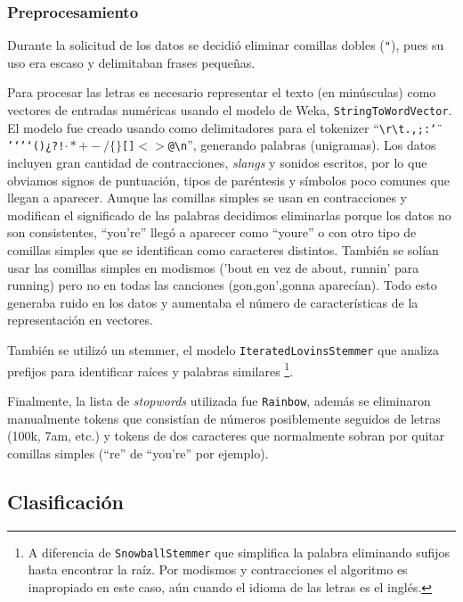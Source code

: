 \documentclass[spanish,11pt,letterpaper]{article}
\begin{document}
\subsubsection{Preprocesamiento}

Durante la solicitud de los datos se decidió eliminar comillas dobles (\texttt{"}),
pues su uso era escaso y delimitaban frases pequeñas.

Para procesar las letras
es necesario representar el texto (en minúsculas) como vectores de entradas numéricas usando
el modelo de Weka, \texttt{StringToWordVector}. El modelo fue creado usando como
delimitadores para el tokenizer
``\texttt{\textvisiblespace\textbackslash r\textbackslash t.,;:\char`\"}%
\texttt{'‘’`()¿?!$\cdot*+-/\{\}$[]$<>$@\textbackslash n}'', generando palabras (unigramas).
Los datos incluyen gran cantidad de contracciones, \textit{slangs} y sonidos escritos, por
lo que obviamos signos de puntuación, tipos de paréntesis y símbolos poco comunes
que llegan a aparecer. Aunque las comillas simples se usan en contracciones y
modifican el significado de las palabras decidimos eliminarlas porque los datos
no son consistentes, ``you're'' llegó a aparecer como ``you\textvisiblespace re''
o con otro tipo de comillas simples que se identifican como caracteres distintos.
También se solían usar las comillas simples en modismos ('bout
en vez de about, runnin' para running) pero no en todas las canciones (gon,gon',gonna
aparecían). Todo esto generaba ruido en los datos y aumentaba el número de
características de la representación en vectores.

También se utilizó un stemmer, el modelo \texttt{IteratedLovinsStemmer} que analiza
prefijos para identificar raíces y palabras similares%
\footnote{A diferencia de \texttt{SnowballStemmer} que simplifica
la palabra eliminando sufijos hasta encontrar la raíz. Por modismos
y contracciones el algoritmo es inapropiado en este caso, aún cuando el idioma
de las letras es el inglés.}.

Finalmente, la lista de \textit{stopwords} utilizada fue \texttt{Rainbow}, además
se eliminaron manualmente tokens que consistían de números posiblemente seguidos de letras
(100k, 7am, etc.) y tokens de dos caracteres que normalmente sobran por quitar
comillas simples (``re'' de ``you're'' por ejemplo).

\subsection{Clasificación}
\end{document}
